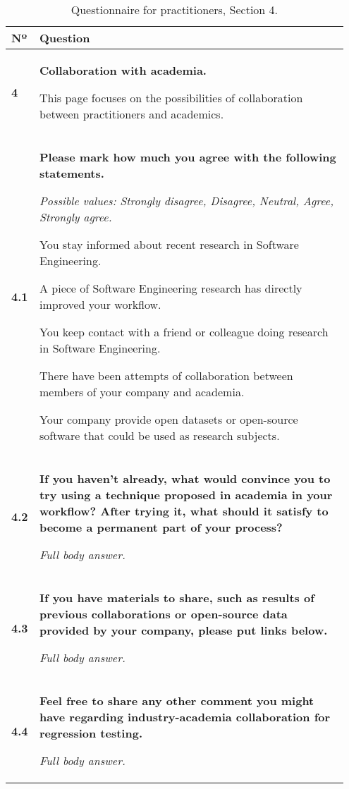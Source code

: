 \begin{table}[]
\centering
\small
{}
\begin{tabular}{p{0.05\linewidth}p{0.9\linewidth}}
\toprule
\textbf{Nº} & \textbf{Question} \\
\midrule
\textbf{4} & \textbf{Collaboration with academia.}

This page focuses on the possibilities of collaboration between practitioners and academics.\\

\textbf{4.1} & \textbf{Please mark how much you agree with the following statements.}

\textit{Possible values: Strongly disagree, Disagree, Neutral, Agree, Strongly agree.}

You stay informed about recent research in Software Engineering.

A piece of Software Engineering research has directly improved your workflow.

You keep contact with a friend or colleague doing research in Software Engineering.

There have been attempts of collaboration between members of your company and academia.

Your company provide open datasets or open-source software that could be used as research subjects.\\

\textbf{4.2} & \textbf{If you haven't already, what would convince you to try using a technique proposed in academia in your workflow? After trying it, what should it satisfy to become a permanent part of your process?}

\textit{Full body answer.}\\

\textbf{4.3} & \textbf{If you have materials to share, such as results of previous collaborations or open-source data provided by your company, please put links below.}

\textit{Full body answer.}\\

\textbf{4.4} & \textbf{Feel free to share any other comment you might have regarding industry-academia collaboration for regression testing.}

\textit{Full body answer.}\\

\bottomrule
\end{tabular}\\
\caption{Questionnaire for practitioners, Section 4.}
\label{table:interview_questions}
\end{table}

